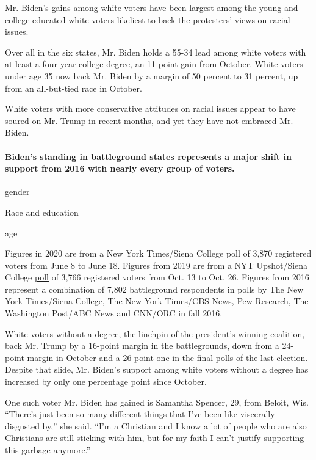 Mr. Biden's gains among white voters have been largest among the young
and college-educated white voters likeliest to back the protesters'
views on racial issues.

Over all in the six states, Mr. Biden holds a 55-34 lead among white
voters with at least a four-year college degree, an 11-point gain from
October. White voters under age 35 now back Mr. Biden by a margin of 50
percent to 31 percent, up from an all-but-tied race in October.

White voters with more conservative attitudes on racial issues appear to
have soured on Mr. Trump in recent months, and yet they have not
embraced Mr. Biden.

\hypertarget{bidens-standing-in-battleground-states-represents-a-major-shift-in-support-from-2016-with-nearly-every-group-of-voters}{%
\paragraph{Biden's standing in battleground states represents a major
shift in support from 2016 with nearly every group of
voters.}\label{bidens-standing-in-battleground-states-represents-a-major-shift-in-support-from-2016-with-nearly-every-group-of-voters}}

gender

Race and education

age

Figures in 2020 are from a New York Times/Siena College poll of 3,870
registered voters from June 8 to June 18. Figures from 2019 are from a
NYT Upshot/Siena College
\href{https://www.nytimes.com/2019/11/04/upshot/trump-biden-warren-polls.html}{poll}
of 3,766 registered voters from Oct. 13 to Oct. 26. Figures from 2016
represent a combination of 7,802 battleground respondents in polls by
The New York Times/Siena College, The New York Times/CBS News, Pew
Research, The Washington Post/ABC News and CNN/ORC in fall 2016.

White voters without a degree, the linchpin of the president's winning
coalition, back Mr. Trump by a 16-point margin in the battlegrounds,
down from a 24-point margin in October and a 26-point one in the final
polls of the last election. Despite that slide, Mr. Biden's support
among white voters without a degree has increased by only one percentage
point since October.

One such voter Mr. Biden has gained is Samantha Spencer, 29, from
Beloit, Wis. ``There's just been so many different things that I've been
like viscerally disgusted by,'' she said. ``I'm a Christian and I know a
lot of people who are also Christians are still sticking with him, but
for my faith I can't justify supporting this garbage anymore.''

